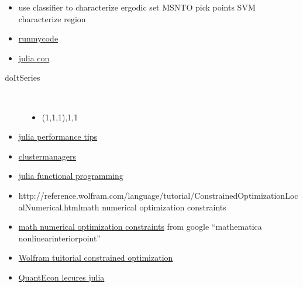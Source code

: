\documentclass[hyperref]{labbook}
\begin{document}
\begin{itemize}
\item use classifier to characterize ergodic set  MSNTO pick points SVM characterize region
\end{itemize}


\begin{itemize}
\item \href{http://www.runmycode.org/faq.html}{runmycode}
\item \href{http://juliacon.org/2018/cfp}{julia con}
\end{itemize}


\begin{description}
\item[doItSeries] \ 
  \begin{itemize}
  \item (1,1,1),1,1
  \end{itemize}
\end{description}


\begin{itemize}
\item \href{https://docs.julialang.org/en/stable/manual/performance-tips/}{julia performance tips}
\item \href{https://github.com/JuliaParallel/ClusterManagers.jl}{clustermanagers}
\item \href{https://groups.google.com/forum/?fromgroups=#!topic/julia-dev/21AGMrqbuM0}{julia functional programming}
\end{itemize}



\begin{itemize}
\item {http://reference.wolfram.com/language/tutorial/ConstrainedOptimizationLocalNumerical.html}{math numerical optimization constraints}
\item \href{http://reference.wolfram.com/language/tutorial/ConstrainedOptimizationLocalNumerical.html}{math numerical optimization constraints} from google ``mathematica nonlinearinteriorpoint''
\item \href{http://www.johnboccio.com/MathematicaTutorials/08_ConstrainedOptimization.pdf}{Wolfram tuitorial constrained optimization}
\item \href{https://lectures.quantecon.org/jl/}{QuantEcon lecures julia}
\end{itemize}
\end{document}
